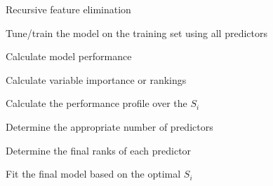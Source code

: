 \documentclass[12pt]{article}
\begin{document}
\begin{algorithm}
   \caption{Recursive feature elimination}
   \label{A:rfe}
   \SetAlgoLined
   \DontPrintSemicolon


    \vspace*{3pt} Tune/train the model on the training set using all predictors\vspace*{3pt}\; 

    \vspace*{3pt} Calculate model performance\vspace*{3pt}\; 

     \vspace*{3pt} Calculate variable importance or rankings\vspace*{3pt} \; 


    \vspace*{3pt} Calculate the performance profile over the $S_i$ \vspace*{3pt}\;
    
    \vspace*{3pt} Determine the appropriate number of predictors\vspace*{3pt}\;

    \vspace*{3pt} Determine the final ranks of each predictor\vspace*{3pt}\;

    \vspace*{3pt} Fit the final model based on the optimal $S_i$ \vspace*{3pt}\;    
    
\end{algorithm}
\end{document}
